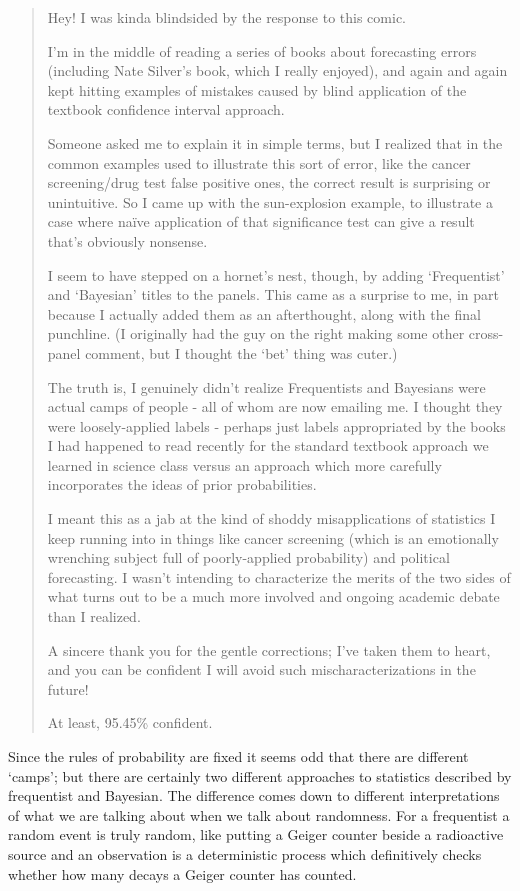\documentclass{article}
\begin{document}
\begin{quote}
Hey! I was kinda blindsided by the response to this comic.

I'm in the middle of reading a series of books about forecasting
errors (including Nate Silver's book, which I really enjoyed), and
again and again kept hitting examples of mistakes caused by blind
application of the textbook confidence interval approach.

Someone asked me to explain it in simple terms, but I realized that in
the common examples used to illustrate this sort of error, like the
cancer screening/drug test false positive ones, the correct result is
surprising or unintuitive. So I came up with the sun-explosion
example, to illustrate a case where na\"{i}ve application of that
significance test can give a result that's obviously nonsense.

I seem to have stepped on a hornet's nest, though, by adding
\lq{}Frequentist\rq{} and \lq{}Bayesian\rq{} titles to the
panels. This came as a surprise to me, in part because I actually
added them as an afterthought, along with the final punchline. (I
originally had the guy on the right making some other cross-panel
comment, but I thought the \lq{}bet\rq{} thing was cuter.)

The truth is, I genuinely didn't realize Frequentists and Bayesians
were actual camps of people - all of whom are now emailing me. I thought
they were loosely-applied labels - perhaps just labels appropriated by
the books I had happened to read recently for the standard textbook
approach we learned in science class versus an approach which more
carefully incorporates the ideas of prior probabilities.

I meant this as a jab at the kind of shoddy misapplications of
statistics I keep running into in things like cancer screening (which
is an emotionally wrenching subject full of poorly-applied
probability) and political forecasting. I wasn't intending to
characterize the merits of the two sides of what turns out to be a
much more involved and ongoing academic debate than I realized.

A sincere thank you for the gentle corrections; I've taken them to
heart, and you can be confident I will avoid such mischaracterizations
in the future!

At least, 95.45\% confident.
\end{quote}

Since the rules of probability are fixed it seems odd that there are
different \lq{}camps\rq{}; but there are certainly two different
approaches to statistics described by frequentist and Bayesian. The
difference comes down to different interpretations of what we are
talking about when we talk about randomness. For a frequentist a
random event is truly random, like putting a Geiger counter beside a
radioactive source and an observation is a deterministic process which
definitively checks whether how many decays a Geiger counter has
counted. 
\end{document}
